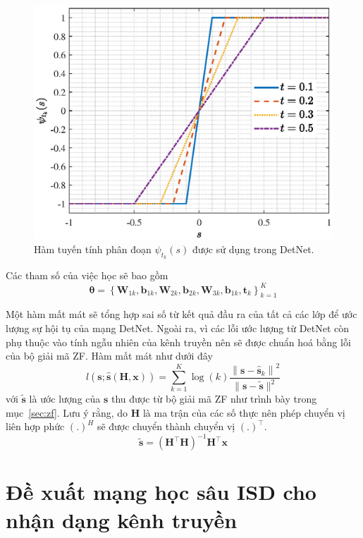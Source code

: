 \begin{figure}[ht]
    \centering
    \includegraphics[width=.6\linewidth]{figures/soft_sign.eps}
    \caption{Hàm tuyến tính phân đoạn $\psi_{t_k}(s)$ được sử dụng trong DetNet.}
    \label{fig:soft_sign}
\end{figure}
Các tham số của việc học sẽ bao gồm 
\begin{equation}
\boldsymbol{\theta}=\left\{\mathbf{W}_{1 k}, \mathbf{b}_{1 k}, \mathbf{W}_{2 k}, \mathbf{b}_{2 k}, \mathbf{W}_{3 k}, \mathbf{b}_{1 k}, \mathbf{t}_k\right\}_{k=1}^K
\end{equation}

Một hàm mất mát sẽ tổng hợp sai số từ kết quả đầu ra của tất cả các lớp để ước lượng sự hội tụ của mạng DetNet. Ngoài ra, vì các lỗi ước lượng từ DetNet còn phụ thuộc vào tính ngẫu nhiên của kênh truyền nên sẽ được chuẩn hoá bằng lỗi của bộ giải mã ZF. Hàm mất mát như dưới đây
\begin{equation}
    l(\mathbf{s} ; \hat{\mathbf{s}}(\mathbf{H}, \mathbf{x}))=\sum_{k=1}^K \log (k) \frac{\left\|\mathbf{s}-\hat{\mathbf{s}}_k\right\|^2}{\|\mathbf{s}-\tilde{\mathbf{s}}\|^2}
\end{equation}
với $\tilde{\mathbf{s}}$ là ước lượng của $\mathbf{s}$ thu được từ bộ giải mã ZF như trình bày trong mục~\ref{sec:zf}. Lưu ý rằng, do $\mathbf{H}$ là ma trận của các số thực nên phép chuyển vị liên hợp phức $(.)^H$ sẽ được chuyển thành chuyển vị $(.)^\top$.
\begin{equation}
    \tilde{\mathbf{s}}=\left(\mathbf{H}^\top \mathbf{H}\right)^{-1} \mathbf{H}^\top \mathbf{x}
\end{equation}

\section{Đề xuất mạng học sâu ISD cho nhận dạng kênh truyền}

